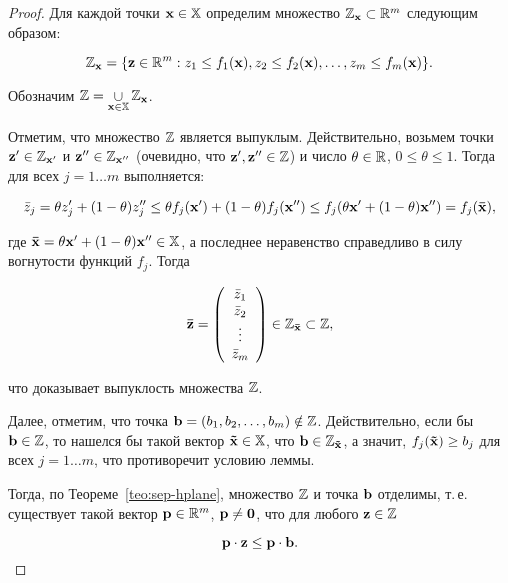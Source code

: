 
\begin{proof}

Для каждой точки $\mathbf{x} \in \mathbb{X}$ определим множество
${\mathbb{Z}_{\mathbf{x}} \subset \mathbb{R}^m}$ следующим образом:

\[
\mathbb{Z}_{\mathbf{x}}=\{\mathbf{z}\in \mathbb{R}^m: z_1\leq f_1(\mathbf{x}), z_2\leq
f_2(\mathbf{x}), \ldots, z_m\leq f_m(\mathbf{x})\}.
\]

Обозначим $\mathbb{Z}= \mathop \cup \limits_{\mathbf{x} \in \mathbb{X}}
\mathbb{Z}_{\mathbf{x}}$.

Отметим, что множество $\mathbb{Z}$ является выпуклым. Действительно,
возьмем точки $\mathbf{z'} \in \mathbb{Z}_{\mathbf{x'}}$ и $\mathbf{z''} \in
\mathbb{Z}_{\mathbf{x''}}$ (очевидно, что $\mathbf{z'}, \mathbf{z''} \in \mathbb{Z}$) и
число $\theta \in \mathbb{R}$, $0 \leq \theta \leq 1$. Тогда для всех $j=1
\ldots m$ выполняется:

\[
\bar{z}_{j}= \theta z'_j + (1- \theta) z''_j\leq  \theta
f_j(\mathbf{x'}) + (1- \theta) f_j(\mathbf{x''}) \leq  f_j(\theta\mathbf{x'} +
(1- \theta) \mathbf{x''})=f_j(\mathbf{\bar x}),
\]

\noindent где $\mathbf{\bar x}=\theta\mathbf{x'} + (1- \theta) \mathbf{x''} \in
\mathbb{X}$, а последнее неравенство справедливо в силу вогнутости
функций $f_j$. Тогда

\[
\vc{\bar z} = \left( {\begin{array}{*{20}c}
   \bar{z}_1  \\
   \bar{z}_2  \\
    \vdots   \\
   \bar{z}_m  \\
\end{array}} \right) \in \st{Z}_{\vc{\bar x}} \subset \st{Z},
\]

\noindent что доказывает выпуклость множества $\mathbb{Z}$.

Далее, отметим, что точка $\mathbf{b} =(b_1, b_2, \ldots, b_m)\notin
\mathbb{Z}$. Действительно, если бы $\mathbf{b} \in \mathbb{Z}$, то нашелся бы
такой вектор $\mathbf{\tilde x} \in \mathbb{X}$, что $\mathbf{b} \in
\mathbb{Z}_{\mathbf{\tilde x}}$, а значит, $f_j(\mathbf{\tilde x}) \geq b_j$ для
всех $j=1 \ldots m$, что противоречит условию леммы.

Тогда, по Теореме~\ref{teo:sep-hplane}, множество $\mathbb{Z}$ и точка
$\mathbf{b}$ отделимы, т.\,е. существует такой вектор $\mathbf{p} \in \mathbb{R}^m$,
$\mathbf{p} \neq \mathbf{0}$, что для любого $\mathbf{z} \in \mathbb{Z}$

\begin{equation}\label{eq:ineq1_fundlemma}
\mathbf{p} \cdot \mathbf{z} \leq \mathbf{p} \cdot \mathbf{b}.
\end{equation}


\end{proof}
